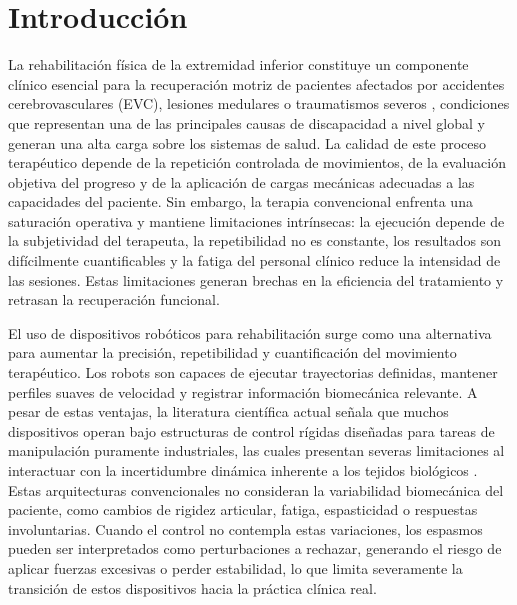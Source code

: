 \documentclass[a4paper,12pt]{article}
\begin{document}
\newpage
\tableofcontents
\newpage
\listoffigures
\newpage
\section{Introducción}



La rehabilitación física de la extremidad inferior constituye un componente clínico esencial para la recuperación motriz de pacientes afectados por accidentes cerebrovasculares (EVC), lesiones medulares o traumatismos severos \citep{who2024neurological}, condiciones que representan una de las principales causas de discapacidad a nivel global y generan una alta carga sobre los sistemas de salud. La calidad de este proceso terapéutico depende de la repetición controlada de movimientos, de la evaluación objetiva del progreso y de la aplicación de cargas mecánicas adecuadas a las capacidades del paciente. Sin embargo, la terapia convencional enfrenta una saturación operativa y mantiene limitaciones intrínsecas: la ejecución depende de la subjetividad del terapeuta, la repetibilidad no es constante, los resultados son difícilmente cuantificables y la fatiga del personal clínico reduce la intensidad de las sesiones. Estas limitaciones generan brechas en la eficiencia del tratamiento y retrasan la recuperación funcional.

El uso de dispositivos robóticos para rehabilitación surge como una alternativa para aumentar la precisión, repetibilidad y cuantificación del movimiento terapéutico. Los robots son capaces de ejecutar trayectorias definidas, mantener perfiles suaves de velocidad y registrar información biomecánica relevante. A pesar de estas ventajas, la literatura científica actual señala que muchos dispositivos operan bajo estructuras de control rígidas diseñadas para tareas de manipulación puramente industriales, las cuales presentan severas limitaciones al interactuar con la incertidumbre dinámica inherente a los tejidos biológicos \citep{banyai2024robotics}. Estas arquitecturas convencionales no consideran la variabilidad biomecánica del paciente, como cambios de rigidez articular, fatiga, espasticidad o respuestas involuntarias. Cuando el control no contempla estas variaciones, los espasmos pueden ser interpretados como perturbaciones a rechazar, generando el riesgo de aplicar fuerzas excesivas o perder estabilidad, lo que limita severamente la transición de estos dispositivos hacia la práctica clínica real.
\end{document}
